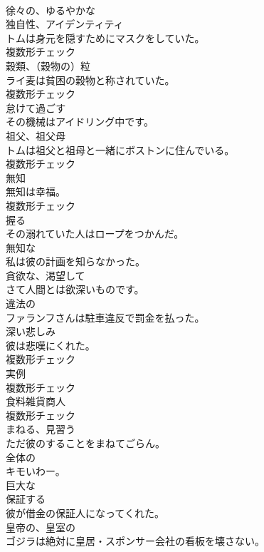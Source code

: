 \documentclass[8pt]{extreport}
\begin{document}
\begin{CJK}{UTF8}{min}
\\	[形容詞]	徐々の、ゆるやかな	
\\	[名詞]	独自性、アイデンティティ	
\\	トムは身元を隠すためにマスクをしていた。	
\\	複数形チェック
\\	[名詞]	穀類、（穀物の）粒	
\\	ライ麦は貧困の穀物と称されていた。	
\\	複数形チェック
\\	[動詞]	怠けて過ごす	
\\	その機械はアイドリング中です。	
\\	[名詞]	祖父、祖父母	
\\	トムは祖父と祖母と一緒にボストンに住んでいる。	
\\	複数形チェック
\\	[名詞]	無知	
\\	無知は幸福。	
\\	複数形チェック
\\	[動詞]	握る	
\\	その溺れていた人はロープをつかんだ。	
\\	[形容詞]	無知な	
\\	私は彼の計画を知らなかった。	
\\	[形容詞]	貪欲な、渇望して	
\\	さて人間とは欲深いものです。	
\\	[形容詞]	違法の	
\\	ファランフさんは駐車違反で罰金を払った。	
\\	[名詞]	深い悲しみ	
\\	彼は悲嘆にくれた。	
\\	複数形チェック
\\	[名詞]	実例	
\\	複数形チェック
\\	[名詞]	食料雑貨商人	
\\	複数形チェック
\\	[動詞]	まねる、見習う	
\\	ただ彼のすることをまねてごらん。	
\\	[形容詞]	全体の	
\\	キモいわー。	
\\	[形容詞]	巨大な	
\\	[動詞]	保証する	
\\	彼が借金の保証人になってくれた。	
\\	[形容詞]	皇帝の、皇室の	
\\	ゴジラは絶対に皇居・スポンサー会社の看板を壊さない。	

\end{CJK}
\end{document}
